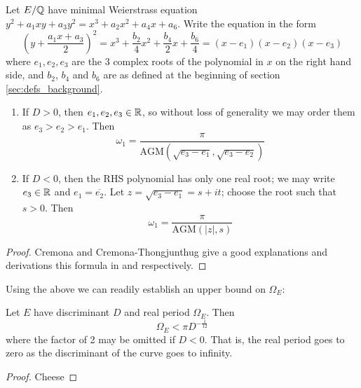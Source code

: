 \documentclass[10pt]{article}
\newcommand{\AGM}{\text{AGM}}
\newcommand{\conj}[1]{\overline{#1}}
\begin{document}
\begin{proposition}\label{prop:real_period_by_AGM}
Let $E/\mathbb{Q}$ have minimal Weierstrass equation $y^2 + a_1 xy + a_3 y^2 = x^3 + a_2 x^2 + a_4 x + a_6$. Write the equation in the form
\begin{equation}\label{eqn:weierstrass_with_bn}
\left(y + \frac{a_1x + a_3}{2}\right)^2 = x^3 + \frac{b_2}{4} x^2 + \frac{b_4}{2} x + \frac{b_6}{4} = (x-e_1)(x-e_2)(x-e_3)
\end{equation}
where $e_1,e_2,e_3$ are the 3 complex roots of the polynomial in $x$ on the right hand side, and $b_2$, $b_4$ and $b_6$ are as defined at the beginning of section \ref{sec:defs_background}.
\begin{enumerate}
\item If $D > 0$, then $e_1,e_2,e_3 \in \mathbb{R}$, so without loss of generality we may order them as $e_3 > e_2 > e_1$. Then
\begin{equation}\label{eqn:omega_D_pos}
\omega_1 = \frac{\pi}{\AGM(\sqrt{e_3-e_1},\sqrt{e_3-e_2})}
\end{equation}
\item If $D < 0$, then the RHS polynomial has only one real root; we may write $e_3 \in \mathbb{R}$ and $e_1 = \conj{e_2}$. Let $z = \sqrt{e_3-e_1} = s + it$; choose the root such that $s>0$. Then
\begin{equation}\label{eqn:omega_D_neg}
\omega_1 = \frac{\pi}{\AGM(|z|,s)}
\end{equation}
\end{enumerate}
\end{proposition}
\begin{proof}
Cremona and Cremona-Thongjunthug give a good explanations and derivations this formula in \cite{Cre-1997} and \cite{Cre-2013} respectively.
\end{proof}

Using the above we can readily establish an upper bound on $\Omega_E$:
\begin{proposition}
Let $E$ have discriminant $D$ and real period $\Omega_E$. Then
\begin{equation}
\Omega_E < \pi D^{-\frac{1}{12}}
\end{equation}
where the factor of 2 may be omitted if $D<0$. That is, the real period goes to zero as the discriminant of the curve goes to infinity.
\end{proposition}
\begin{proof}
Cheese
\end{proof}
\end{document}
